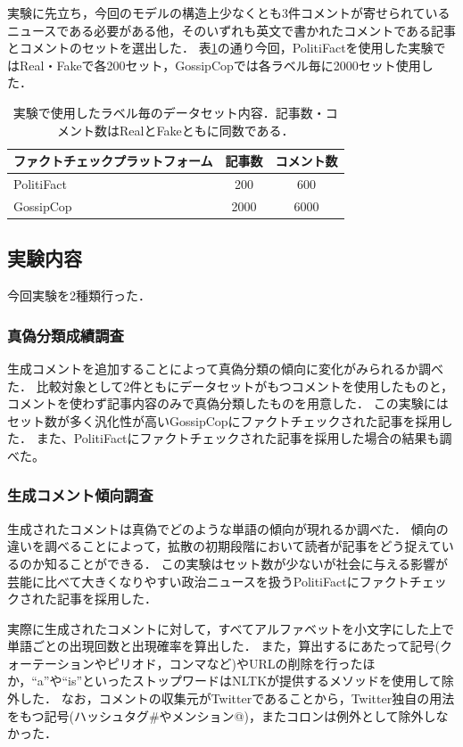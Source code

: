実験に先立ち，今回のモデルの構造上少なくとも3件コメントが寄せられているニュースである必要がある他，そのいずれも英文で書かれたコメントである記事とコメントのセットを選出した．
表\ref{tbl:dataset}の通り今回，PolitiFactを使用した実験ではReal・Fakeで各200セット，GossipCopでは各ラベル毎に2000セット使用した．

\begin{table}[h]
    \caption{実験で使用したラベル毎のデータセット内容．記事数・コメント数はRealとFakeともに同数である．}
    \label{tbl:dataset}
    \centering
    \begin{tabular}{lcc}
        \hline
        ファクトチェックプラットフォーム     & 記事数 & コメント数 \\ \hline
        PolitiFact & 200   & 600   \\
        GossipCop  & 2000  & 6000  \\ \hline
    \end{tabular}
\end{table}

\subsection{実験内容}
\label{sec:exp_contents}
今回実験を2種類行った．

\subsubsection{真偽分類成績調査}
生成コメントを追加することによって真偽分類の傾向に変化がみられるか調べた．
比較対象として2件ともにデータセットがもつコメントを使用したものと，コメントを使わず記事内容のみで真偽分類したものを用意した．
この実験にはセット数が多く汎化性が高いGossipCopにファクトチェックされた記事を採用した．
また、PolitiFactにファクトチェックされた記事を採用した場合の結果も調べた。

\subsubsection{生成コメント傾向調査}
生成されたコメントは真偽でどのような単語の傾向が現れるか調べた．
傾向の違いを調べることによって，拡散の初期段階において読者が記事をどう捉えているのか知ることができる．
この実験はセット数が少ないが社会に与える影響が芸能に比べて大きくなりやすい政治ニュースを扱うPolitiFactにファクトチェックされた記事を採用した．

実際に生成されたコメントに対して，すべてアルファベットを小文字にした上で単語ごとの出現回数と出現確率を算出した．
また，算出するにあたって記号(クォーテーションやピリオド，コンマなど)やURLの削除を行ったほか，``a''や``is''といったストップワードはNLTK\cite{bird-loper-2004-nltk}が提供するメソッドを使用して除外した．
なお，コメントの収集元がTwitterであることから，Twitter独自の用法をもつ記号(ハッシュタグ\#やメンション@)，またコロンは例外として除外しなかった．

